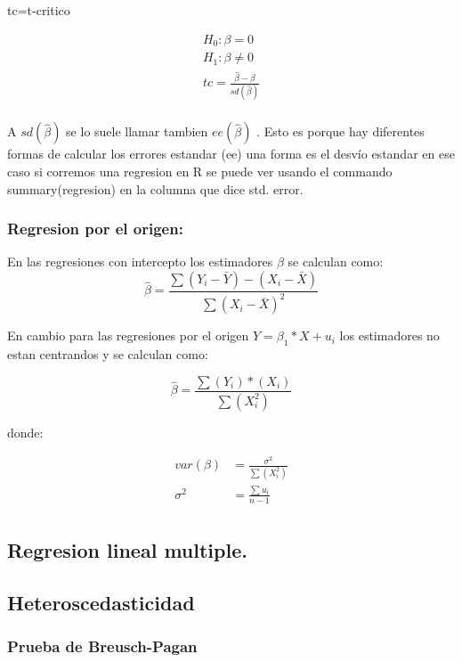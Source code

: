 \documentclass[
]{article}
\begin{document}
tc=t-critico

\[
\begin{align}
  H_0: \beta=0 \\
  H_1: \beta \not=  0 \\ 
  tc=\frac{\hat\beta-\beta}{sd(\hat\beta)}  \\ 
\end{align}
\]

A \(sd(\hat\beta)\) se lo suele llamar tambien \(ee(\hat\beta)\) . Esto
es porque hay diferentes formas de calcular los errores estandar (ee)
una forma es el desvío estandar en ese caso si corremos una regresion en
R se puede ver usando el commando summary(regresion) en la columna que
dice std. error.

\hypertarget{regresion-por-el-origen}{%
\subsubsection{Regresion por el origen:}\label{regresion-por-el-origen}}

En las regresiones con intercepto los estimadores \(\beta\) se calculan
como: \[
  \hat\beta=\frac{\sum{(Y_i-\bar Y)-(X_i-\bar X)}}{\sum{(X_i-\bar X)^2}}
\]

En cambio para las regresiones por el origen \(Y=\beta_1*X+u_i\) los
estimadores no estan centrandos y se calculan como:

\[
  \hat\beta=\frac{\sum{(Y_i)*(X_i)}}{\sum{(X_i^2)}}
\]

donde:

\[
\begin{align}
  var(\beta)&=\frac{\sigma^2}{\sum(X_i^2)} \\
  \sigma^2&=\frac{\sum{u_i}}{n-1} \\
\end{align}
\]

\hypertarget{regresion-lineal-multiple.}{%
\subsection{Regresion lineal
multiple.}\label{regresion-lineal-multiple.}}

\hypertarget{heteroscedasticidad}{%
\subsection{Heteroscedasticidad}\label{heteroscedasticidad}}

\hypertarget{prueba-de-breusch-pagan}{%
\subsubsection{Prueba de Breusch-Pagan}\label{prueba-de-breusch-pagan}}
\end{document}
